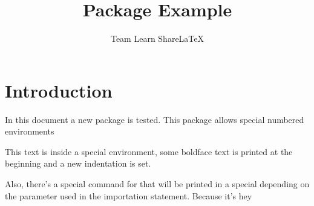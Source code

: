 \documentclass{article}
\title{Package Example}
\author{Team Learn ShareLaTeX}
\date{ }
\begin{document}
 
\maketitle
 
\section{Introduction}
In this document a new package is tested. This package allows special numbered
environments
 
\begin{example}
This text is inside a special environment, some boldface text is printed
at the beginning and a new indentation is set.
\end{example}
 
Also, there's a special command for  that will be
printed in a special  depending on the parameter used in the
 importation statement. Because it's 
hey
\printindex
 
\end{document}
